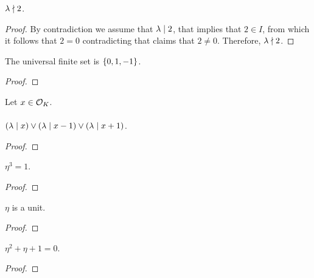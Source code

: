 \begin{lemma}
    \label{lmm:lambda_not_dvd_two}
    \leanok
    $\lambda \nmid 2$.
\end{lemma}
\begin{proof}
    \leanok
    By contradiction we assume that $\lambda \mid 2$, that implies that $2 \in I$,
    from which it follows that $2 = 0$ contradicting 
    that claims that $2 \neq 0$. Therefore, $\lambda \nmid 2$.
\end{proof}

\begin{lemma}
    \label{lmm:univ_quot}
    \leanok
    The universal finite set is $\left\{0, 1, -1\right\}$.
\end{lemma}
\begin{proof}
    \leanok
\end{proof}

\begin{lemma}
    \label{lmm:dvd_or_dvd_sub_one_or_dvd_add_one}
    \leanok
    Let $x \in \mathcal{O}_K$. \\\\
    $(\lambda \mid x) \lor (\lambda \mid x-1) \lor (\lambda \mid x+1)$.
\end{lemma}
\begin{proof}
    \leanok
\end{proof}

\begin{lemma}
    \label{lmm:toInteger_cube_eq_one}
    \leanok
    $\eta^3 = 1$.
\end{lemma}
\begin{proof}
    \leanok
\end{proof}

\begin{lemma}
    \label{lmm:eta_isUnit}
    \leanok
    $\eta$ is a unit.
\end{lemma}
\begin{proof}
    \leanok
\end{proof}

\begin{lemma}
    \label{lmm:toInteger_eval_cyclo}
    \leanok
    $\eta^2 + \eta + 1 = 0$.
\end{lemma}
\begin{proof}
    \leanok
\end{proof}

